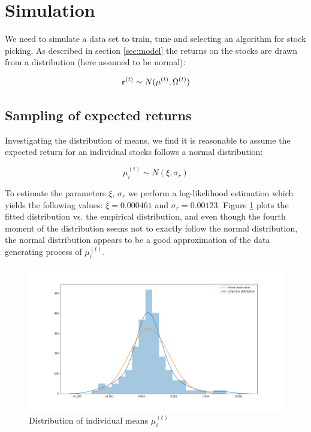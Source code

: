 \section{Simulation}

We need to simulate a data set to train, tune and selecting an algorithm for stock picking. As described in section \ref{sec:model} the returns on the stocks are drawn from a distribution (here assumed to be normal):

\begin{equation}
    \mathbf{r}^{(t)} \sim N(\mu^{(t)}, \Omega^{(t)})
\end{equation}

\subsection{Sampling of expected returns}

Investigating the distribution of means, we find it is reasonable to assume the expected return for an individual stocks follows a normal distribution:

\begin{equation}
    \mu^{(t)}_{i} \sim N(\xi, \sigma_{r})
\end{equation}

To estimate the parameters $\xi$, $\sigma_r$ we perform a log-likelihood estimation which yields the following values: $\xi=0.000461$ and $\sigma_r = 0.00123$. Figure \ref{fig:distmeans} plots the fitted distribution vs. the empirical distribution, and even though the fourth moment of the distribution seems not to exactly follow the normal distribution, the normal distribution appears to be a good approximation of the data generating process of $\mu_i^{(t)}$.

\begin{figure}[ht]
\centering
\includegraphics[scale=0.3]{figures/distribution_means.png}
\caption{Distribution of individual means $\mu_i^{(t)}$}
\label{fig:distmeans}
\end{figure}



